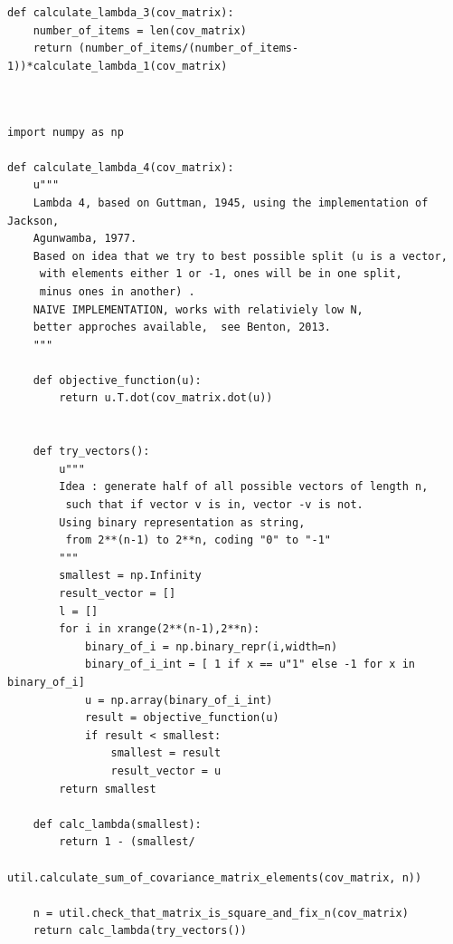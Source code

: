 \documentclass[a4paper,12pt,oneside]{article}
\newenvironment{customFloatWrap}{}{}
\numberwithin{equation}{section}
\theoremstyle{definition}
\begin{document}
\vspace{10pt}

\begin{customFloatWrap}
\begin{verbatim}
def calculate_lambda_3(cov_matrix):
    number_of_items = len(cov_matrix)
    return (number_of_items/(number_of_items-1))*calculate_lambda_1(cov_matrix)      
  
\end{verbatim}
\end{customFloatWrap}

\vspace{10pt}
        
\begin{customFloatWrap}
\begin{verbatim}

import numpy as np

def calculate_lambda_4(cov_matrix):
    u"""
    Lambda 4, based on Guttman, 1945, using the implementation of Jackson,
    Agunwamba, 1977.
    Based on idea that we try to best possible split (u is a vector,
     with elements either 1 or -1, ones will be in one split, 
     minus ones in another) .
    NAIVE IMPLEMENTATION, works with relativiely low N, 
    better approches available,  see Benton, 2013.
    """
    
    def objective_function(u):
        return u.T.dot(cov_matrix.dot(u))

    
    def try_vectors():
        u"""
        Idea : generate half of all possible vectors of length n,
         such that if vector v is in, vector -v is not. 
        Using binary representation as string,
         from 2**(n-1) to 2**n, coding "0" to "-1"
        """
        smallest = np.Infinity
        result_vector = []
        l = []
        for i in xrange(2**(n-1),2**n):
            binary_of_i = np.binary_repr(i,width=n)
            binary_of_i_int = [ 1 if x == u"1" else -1 for x in binary_of_i]
            u = np.array(binary_of_i_int)
            result = objective_function(u)
            if result < smallest:
                smallest = result
                result_vector = u
        return smallest
             
    def calc_lambda(smallest):
        return 1 - (smallest/
            util.calculate_sum_of_covariance_matrix_elements(cov_matrix, n))
        
    n = util.check_that_matrix_is_square_and_fix_n(cov_matrix)
    return calc_lambda(try_vectors())

\end{verbatim}
\end{customFloatWrap}
\end{document}
